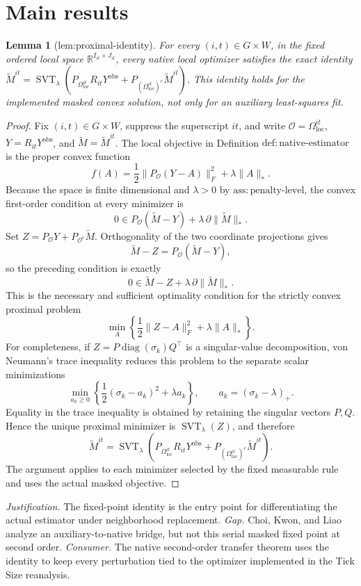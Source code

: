 \documentclass{article}
\newtheorem{lemma}{Lemma}
\begin{document}
\section{Main results}

\begin{lemma}[lem:proximal-identity]\label{lem:proximal-identity}
For every \((i,t)\in G\times W\), in the fixed ordered local space \(\mathbb R^{I_{it}\times J_{it}}\), every native local optimizer satisfies the exact identity \(\widetilde M^{it}=\operatorname{SVT}_{\lambda}(P_{\Omega_{\mathrm{loc}}^{it}}R_{it}Y^{\mathrm{obs}}+P_{(\Omega_{\mathrm{loc}}^{it})^c}\widetilde M^{it})\). This identity holds for the implemented masked convex solution, not only for an auxiliary least-squares fit.
\end{lemma}
\begin{proof}
Fix \((i,t)\in G\times W\), suppress the superscript \(it\), and write \(\mathcal O=\Omega_{\mathrm{loc}}^{it}\), \(Y=R_{it}Y^{\mathrm{obs}}\), and \(\widetilde M=\widetilde M^{it}\).  The local objective in Definition \(\mathrm{def:native\mbox{-}estimator}\) is the proper convex function
\[
 f(A)=\frac12\lVert P_{\mathcal O}(Y-A)\rVert_F^2+\lambda\lVert A\rVert_*.
\]
Because the space is finite dimensional and \(\lambda>0\) by \(\mathrm{ass:penalty\mbox{-}level}\), the convex first-order condition at every minimizer is
\[
 0\in P_{\mathcal O}(\widetilde M-Y)+\lambda\,\partial\lVert\widetilde M\rVert_*.
\]
Set \(Z=P_{\mathcal O}Y+P_{\mathcal O^c}\widetilde M\).  Orthogonality of the two coordinate projections gives
\[
 \widetilde M-Z=P_{\mathcal O}(\widetilde M-Y),
\]
so the preceding condition is exactly
\[
 0\in \widetilde M-Z+\lambda\,\partial\lVert\widetilde M\rVert_*.
\]
This is the necessary and sufficient optimality condition for the strictly convex proximal problem
\[
 \min_A\left\{\frac12\lVert Z-A\rVert_F^2+\lambda\lVert A\rVert_*\right\}.
\]
For completeness, if \(Z=P\operatorname{diag}(\sigma_k)Q^{\top}\) is a singular-value decomposition, von Neumann's trace inequality reduces this problem to the separate scalar minimizations
\[
 \min_{a_k\ge0}\left\{\frac12(\sigma_k-a_k)^2+\lambda a_k\right\},
 \qquad a_k=(\sigma_k-\lambda)_+.
\]
Equality in the trace inequality is obtained by retaining the singular vectors \(P,Q\).  Hence the unique proximal minimizer is \(\operatorname{SVT}_{\lambda}(Z)\), and therefore
\[
 \widetilde M^{it}=\operatorname{SVT}_{\lambda}\!\left(P_{\Omega_{\mathrm{loc}}^{it}}R_{it}Y^{\mathrm{obs}}+P_{(\Omega_{\mathrm{loc}}^{it})^c}\widetilde M^{it}\right).
\]
The argument applies to each minimizer selected by the fixed measurable rule and uses the actual masked objective.
\end{proof}
\par\smallskip\noindent \textit{Justification.} The fixed-point identity is the entry point for differentiating the actual estimator under neighborhood replacement. \textit{Gap.} Choi, Kwon, and Liao analyze an auxiliary-to-native bridge, but not this serial masked fixed point at second order. \textit{Consumer.} The native second-order transfer theorem uses the identity to keep every perturbation tied to the optimizer implemented in the Tick Size reanalysis.
\end{document}
